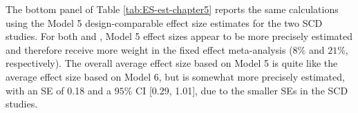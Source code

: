 \documentclass[
]{book}
\begin{document}
\begin{table}

\caption{\label{tab:ES-est-chapter5}Fixed Effect Meta-Analysis Calculations for 
             Example Writing Intervention Studies}
\centering
{}
\end{table}

The bottom panel of Table \ref{tab:ES-est-chapter5} reports the same calculations using the Model 5 design-comparable effect size estimates for the two SCD studies. For both \citet{datchuk2016Writing} and \citet{rodgers2021Effects}, Model 5 effect sizes appear to be more precisely estimated and therefore receive more weight in the fixed effect meta-analysis (\(8\%\) and \(21\%\), respectively). The overall average effect size based on Model 5 is quite like the average effect size based on Model 6, but is somewhat more precisely estimated, with an SE of 0.18 and a \(95\%\) CI {[}0.29, 1.01{]}, due to the smaller SEs in the SCD studies.
\end{document}

